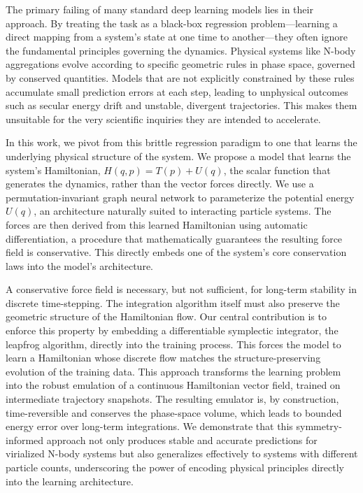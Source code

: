 \documentclass[]{article}
\begin{document}
The primary failing of many standard deep learning models lies in their approach. By treating the task as a black-box regression problem—learning a direct mapping from a system's state at one time to another—they often ignore the fundamental principles governing the dynamics. Physical systems like N-body aggregations evolve according to specific geometric rules in phase space, governed by conserved quantities. Models that are not explicitly constrained by these rules accumulate small prediction errors at each step, leading to unphysical outcomes such as secular energy drift and unstable, divergent trajectories. This makes them unsuitable for the very scientific inquiries they are intended to accelerate.

In this work, we pivot from this brittle regression paradigm to one that learns the underlying physical structure of the system. We propose a model that learns the system's Hamiltonian, $H(q, p) = T(p) + U(q)$, the scalar function that generates the dynamics, rather than the vector forces directly. We use a permutation-invariant graph neural network to parameterize the potential energy $U(q)$, an architecture naturally suited to interacting particle systems. The forces are then derived from this learned Hamiltonian using automatic differentiation, a procedure that mathematically guarantees the resulting force field is conservative. This directly embeds one of the system's core conservation laws into the model's architecture.

A conservative force field is necessary, but not sufficient, for long-term stability in discrete time-stepping. The integration algorithm itself must also preserve the geometric structure of the Hamiltonian flow. Our central contribution is to enforce this property by embedding a differentiable symplectic integrator, the leapfrog algorithm, directly into the training process. This forces the model to learn a Hamiltonian whose discrete flow matches the structure-preserving evolution of the training data. This approach transforms the learning problem into the robust emulation of a continuous Hamiltonian vector field, trained on intermediate trajectory snapshots. The resulting emulator is, by construction, time-reversible and conserves the phase-space volume, which leads to bounded energy error over long-term integrations. We demonstrate that this symmetry-informed approach not only produces stable and accurate predictions for virialized N-body systems but also generalizes effectively to systems with different particle counts, underscoring the power of encoding physical principles directly into the learning architecture.
\end{document}
